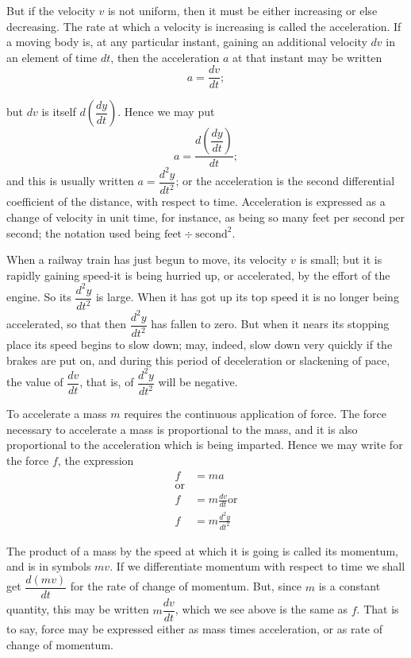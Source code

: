 \documentclass{ximera}
\begin{document}
But if the velocity $v$ is not uniform, then it must
be either increasing or else decreasing. The rate at
which a velocity is increasing is called the acceleration.
If a moving body is, at any particular instant, gaining
an additional velocity $dv$ in an element of time $dt$,
then the acceleration $a$ at that instant may be written
\[
a = \dfrac{dv}{dt};
\]

but $dv$ is itself $d\left( \dfrac{dy}{dt} \right)$. Hence we may put
\[
a = \frac{d\left( \dfrac{dy}{dt} \right)}{dt};
\]
and this is usually written $a = \dfrac{d^2y}{dt^2}$;
or the acceleration is the second differential coefficient
of the distance, with respect to time. Acceleration is
expressed as a change of velocity in unit time, for
instance, as being so many feet per second per second;
the notation used being $\text{feet} \div \text{second}^2$.

When a railway train has just begun to move, its
velocity $v$ is small; but it is rapidly gaining speed-it
is being hurried up, or accelerated, by the effort of the
engine. So its $\dfrac{d^2y}{dt^2}$ is large. When it has got up its
top speed it is no longer being accelerated, so that
then $\dfrac{d^2y}{dt^2}$ has fallen to zero. But when it nears its
stopping place its speed begins to slow down; may,
indeed, slow down very quickly if the brakes are put
on, and during this period of deceleration or slackening
of pace, the value of $\dfrac{dv}{dt}$, that is, of $\dfrac{d^2y}{dt^2}$ will be negative.

To accelerate a mass $m$ requires the continuous
application of force. The force necessary to accelerate
a mass is proportional to the mass, and it is also
proportional to the acceleration which is being imparted.
Hence we may write for the force $f$, the
expression
\begin{align}
f &= ma \\
 \text{or}\\ f &= m \frac{dv}{dt}
 \text{or}\\ f &= m \frac{d^2y}{dt^2}
\end{align}

The product of a mass by the speed at which it is
going is called its momentum, and is in symbols $mv$.
If we differentiate momentum with respect to time
we shall get $\dfrac{d(mv)}{dt}$ for the rate of change of momentum.
But, since $m$ is a constant quantity, this
may be written $m \dfrac{dv}{dt}$, which we see above is the same
as $f$. That is to say, force may be expressed either
as mass times acceleration, or as rate of change of
momentum.
\end{document}
